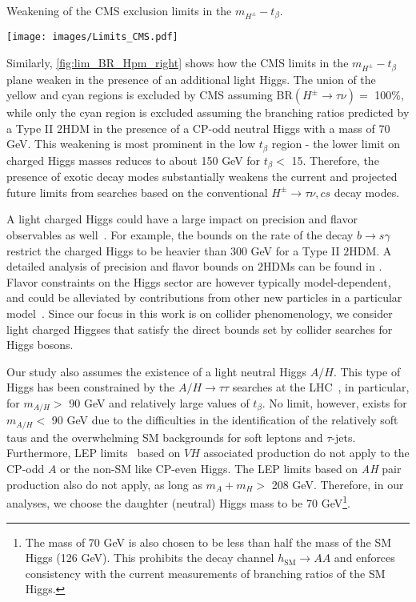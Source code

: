 \begin{marginfigure}[-5cm]
  \caption{Weakening of the CMS exclusion limits in the $m_{H^\pm}-t_\beta$.}
 	\texttt{[image: images/Limits\_CMS.pdf]}
\label{fig:lim_BR_Hpm_right}
\end{marginfigure}
Similarly, \autoref{fig:lim_BR_Hpm_right} shows how the CMS limits in the $m_{H^{\pm}}-t_{\beta}$ plane weaken in the presence of an additional light Higgs. The union of the yellow and cyan regions is excluded by CMS assuming BR$(H^{\pm} \rightarrow \tau \nu) =$ 100\%, while only the cyan region is excluded assuming the branching ratios predicted by a Type II $2$HDM in the presence of a CP-odd neutral Higgs with a mass of 70 GeV. This weakening is most prominent in the low $t_\beta$ region - the lower limit on charged Higgs masses reduces to about 150 GeV for $t_{\beta}<$ 15. Therefore, the presence of exotic decay modes substantially weakens the current and projected future limits from searches based on the conventional $H^{\pm} \rightarrow \tau \nu, cs$ decay modes. 

A light charged Higgs could have a large impact on precision and flavor observables as well~\cite{Olive2016}. For example, the bounds on the rate of the decay $b\rightarrow s\gamma$ restrict the charged Higgs to be heavier than 300 GeV for a Type II $2$HDM. A detailed analysis of precision and flavor bounds on $2$HDMs can be found in \cite{Coleppa:2013dya,Mahmoudi:2009zx}. Flavor constraints on the Higgs sector are however typically model-dependent, and could be alleviated by contributions from other new particles in a particular model~\cite{Han:2013mga}. Since our focus in this work is on collider phenomenology, we consider light charged Higgses that satisfy the direct bounds set by collider searches for Higgs bosons.

Our study also assumes the existence of a light neutral Higgs $A/H$. This type of Higgs has been constrained by the $A/H \rightarrow \tau\tau$ searches at the LHC~\cite{Khachatryan:2014wca,Aad:2014vgg}, in particular, for $m_{A/H}>$ 90 GeV and relatively large values of $t_{\beta}$. No limit, however, exists for $m_{A/H}<$ 90 GeV due to the difficulties in the identification of the relatively soft taus and the overwhelming SM backgrounds for soft leptons and $\tau$-jets. Furthermore, LEP limits~\cite{LEP_Higgs} based on $VH$ associated production do not apply to the CP-odd $A$ or the non-SM like CP-even Higgs. The LEP limits based on \emph{AH} pair production also do not apply, as long as $m_A+m_H>$ 208 GeV. Therefore, in our analyses, we choose the daughter (neutral) Higgs mass to be 70 GeV\footnote{The mass of 70 GeV is also chosen to be less than half the mass of the SM Higgs (126 GeV). This prohibits the decay channel $h_\text{SM} \rightarrow AA$ and enforces consistency with the current measurements of branching ratios of the SM Higgs.}.

